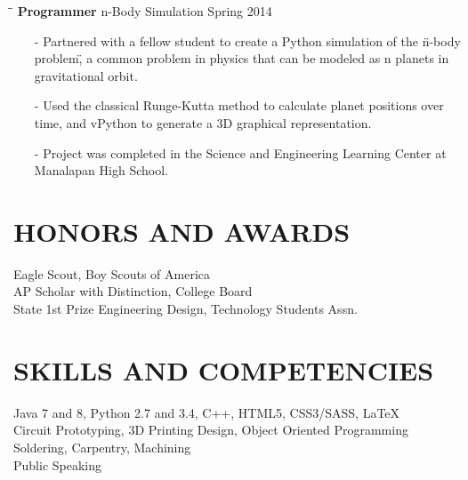 \documentclass{res}
\begin{document}
\begin{resume}
  \begin{tabbing}
    \hspace{2.3in}\= \hspace{2.4in}\= \kill
    {\bf Programmer} \>n-Body Simulation \>Spring 2014\\
  \end{tabbing}\vspace{-15pt}
  \begin{itemize}[leftmargin=*, nolistsep]
    \item[-] Partnered with a fellow student to create a Python simulation of the \"n-body problem\", a common problem in physics that can be modeled as n planets in gravitational orbit.
    \item[-] Used the classical Runge-Kutta method to calculate planet positions over time, and vPython to generate a 3D graphical representation.
    \item[-] Project was completed in the Science and Engineering Learning Center at Manalapan High School.
  \end{itemize}
 
\section{HONORS AND AWARDS}
	Eagle Scout, Boy Scouts of America \\
	AP Scholar with Distinction, College Board \\
	State 1st Prize Engineering Design, Technology Students Assn.

\section{SKILLS AND COMPETENCIES}
  Java 7 and 8, Python 2.7 and 3.4, C++, HTML5, CSS3/SASS, \LaTeX \\
  Circuit Prototyping, 3D Printing Design, Object Oriented Programming \\
  Soldering, Carpentry, Machining \\
  Public Speaking
	
\end{resume}
\end{document}

